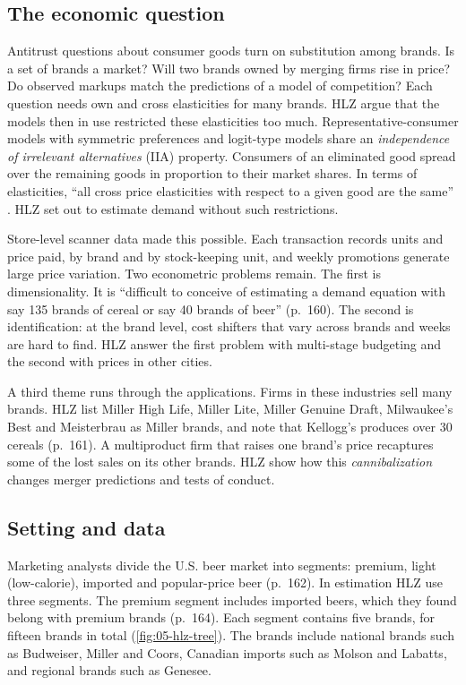 \subsection{The economic question}\label{sec:05-hlz-question}

Antitrust questions about consumer goods turn on substitution among brands. Is a set of brands a market? Will
two brands owned by merging firms rise in price? Do observed markups match the predictions of a model of
competition? Each question needs own and cross elasticities for many brands. HLZ argue that the models then in
use restricted these elasticities too much. Representative-consumer models with symmetric preferences and
logit-type models share an \emph{independence of irrelevant alternatives} (IIA) property. Consumers of an
eliminated good spread over the remaining goods in proportion to their market shares. In terms
of elasticities, ``all cross price elasticities with respect to a given good are the same''
\citep[p.~160]{HausmanLeonardZona1994}. HLZ set out to estimate demand without such restrictions.

Store-level scanner data made this possible. Each transaction records units and price paid, by brand and by
stock-keeping unit, and weekly promotions generate large price variation. Two econometric problems remain. The
first is dimensionality. It is ``difficult to conceive of estimating a demand equation with say 135 brands of
cereal or say 40 brands of beer'' (p.~160). The second is identification: at the brand level, cost shifters that
vary across brands and weeks are hard to find. HLZ answer the first problem with multi-stage budgeting and the
second with prices in other cities.

A third theme runs through the applications. Firms in these industries sell many brands. HLZ list Miller High
Life, Miller Lite, Miller Genuine Draft, Milwaukee's Best and Meisterbrau as Miller brands, and note that
Kellogg's produces over 30 cereals (p.~161). A multiproduct firm that raises one brand's price recaptures some
of the lost sales on its other brands. HLZ show how this \emph{cannibalization} changes merger predictions and
tests of conduct.

\subsection{Setting and data}\label{sec:05-hlz-data}

Marketing analysts divide the U.S. beer market into segments: premium, light (low-calorie), imported and
popular-price beer (p.~162). In estimation HLZ use three segments. The premium segment includes imported
beers, which they found belong with premium brands (p.~164). Each segment contains five brands, for fifteen
brands in total (\cref{fig:05-hlz-tree}). The brands include national brands such as Budweiser, Miller and
Coors, Canadian imports such as Molson and Labatts, and regional brands such as Genesee.

